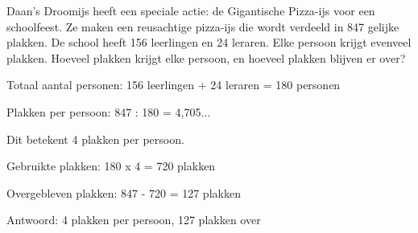 \begin{opgave}
Daan's Droomijs heeft een speciale actie: de Gigantische Pizza-ijs voor een 
schoolfeest. Ze maken een reusachtige pizza-ijs die wordt verdeeld in 847 
gelijke plakken. De school heeft 156 leerlingen en 24 leraren. Elke persoon 
krijgt evenveel plakken. Hoeveel plakken krijgt elke persoon, en hoeveel 
plakken blijven er over?
\end{opgave}

\begin{oplossing}
Totaal aantal personen:
156 leerlingen + 24 leraren = 180 personen

Plakken per persoon:
847 : 180 = 4,705...

Dit betekent 4 plakken per persoon.

Gebruikte plakken:
180 x 4 = 720 plakken

Overgebleven plakken:
847 - 720 = 127 plakken

Antwoord: 4 plakken per persoon, 127 plakken over
\end{oplossing}